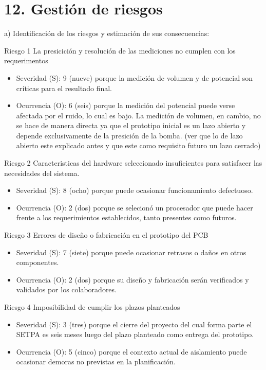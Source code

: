 \documentclass[11pt]{charter}
\begin{document}
\section{12. Gestión de riesgos}
\label{sec:riesgos}

a) Identificación de los riesgos y estimación de sus consecuencias:
 
Riesgo 1 La presicición y resolución de las mediciones no cumplen con los requerimentos
\begin{itemize}
\item Severidad (S): 9 (nueve) porque la medición de volumen y de potencial son críticas para el resultado final.
\item Ocurrencia (O): 6 (seis) porque la medición del potencial puede verse afectada por el ruido, lo cual es bajo. La medición de volumen, en cambio, no se hace de manera directa ya que el prototipo inicial es un lazo abierto y depende exclusivamente de la presición de la bomba.
(ver que lo de lazo abierto este explicado antes y que este como requisito futuro un lazo cerrado)
\end{itemize} 

Riesgo 2 Caracteristicas del hardware seleccionado insuficientes para satisfacer las necesidades del sistema.
\begin{itemize}
\item Severidad (S): 8 (ocho) porque puede ocasionar funcionamiento defectuoso.
\item Ocurrencia (O): 2 (dos) porque se selecionó un procesador que puede hacer frente a los requerimientos establecidos, tanto presentes como futuros.
\end{itemize} 

Riesgo 3 Errores de diseño o fabricación en el prototipo del PCB
\begin{itemize}
\item Severidad (S): 7 (siete) porque puede ocasionar retrasos o daños en otros componentes.
\item Ocurrencia (O): 2 (dos) porque su diseño y fabricación serán verificados y validados por los colaboradores.
\end{itemize} 

Riesgo 4 Imposibilidad de cumplir los plazos planteados
\begin{itemize}
\item Severidad (S): 3 (tres) porque el cierre del proyecto del cual forma parte el SETPA es seis meses luego del plazo planteado como entrega del prototipo.
\item Ocurrencia (O): 5 (cinco) porque el contexto actual de aislamiento puede ocasionar demoras no previstas en la planificación.
\end{itemize} 
\end{document}
